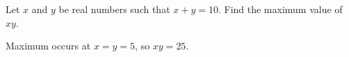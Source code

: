 \question Let $x$ and $y$ be real numbers such that $x + y = 10$. Find the maximum value of $xy$.
\begin{solution}
Maximum occurs at $x = y = 5$, so $xy = 25$.
\end{solution}
